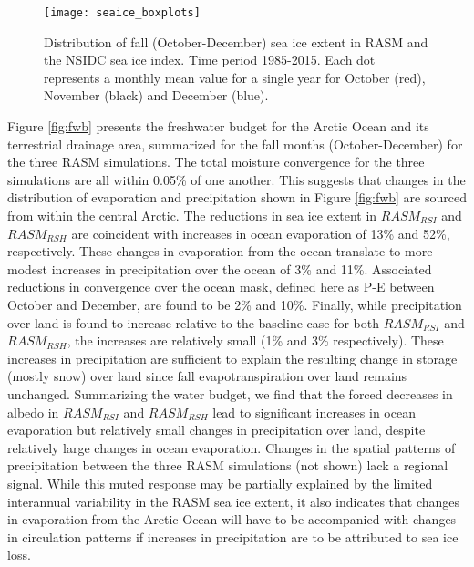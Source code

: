 \begin{figure}
  \centering
  \texttt{[image: seaice\_boxplots]}
  \caption{Distribution of fall (October-December) sea ice extent in RASM and the NSIDC sea ice index. Time period 1985-2015. Each dot represents a monthly mean value for a single year for October (red), November (black) and December (blue).}
  \label{fig:sea_ice_box}
\end{figure}

Figure \ref{fig:fwb} presents the freshwater budget for the Arctic Ocean and its terrestrial drainage area, summarized for the fall months (October-December) for the three RASM simulations.
The total moisture convergence for the three simulations are all within 0.05\% of one another.
This suggests that changes in the distribution of evaporation and precipitation shown in Figure \ref{fig:fwb} are sourced from within the central Arctic.
The reductions in sea ice extent in $RASM_{RSI}$ and $RASM_{RSH}$ are coincident with increases in ocean evaporation of 13\% and 52\%, respectively.
These changes in evaporation from the ocean translate to more modest increases in precipitation over the ocean of 3\% and 11\%.
Associated reductions in convergence over the ocean mask, defined here as P-E between October and December, are found to be 2\% and 10\%. %
Finally, while precipitation over land is found to increase relative to the baseline case for both $RASM_{RSI}$ and $RASM_{RSH}$, the increases are relatively small (1\% and 3\% respectively).
These increases in precipitation are sufficient to explain the resulting change in storage (mostly snow) over land since fall evapotranspiration over land remains unchanged. %
Summarizing the water budget, we find that the forced decreases in albedo in $RASM_{RSI}$ and $RASM_{RSH}$ lead to significant increases in ocean evaporation but relatively small changes in precipitation over land, despite relatively large changes in ocean evaporation.
Changes in the spatial patterns of precipitation between the three RASM simulations (not shown) lack a regional signal.
While this muted response may be partially explained by the limited interannual variability in the RASM sea ice extent, it also indicates that changes in evaporation from the Arctic Ocean will have to be accompanied with changes in circulation patterns if increases in precipitation are to be attributed to sea ice loss.

